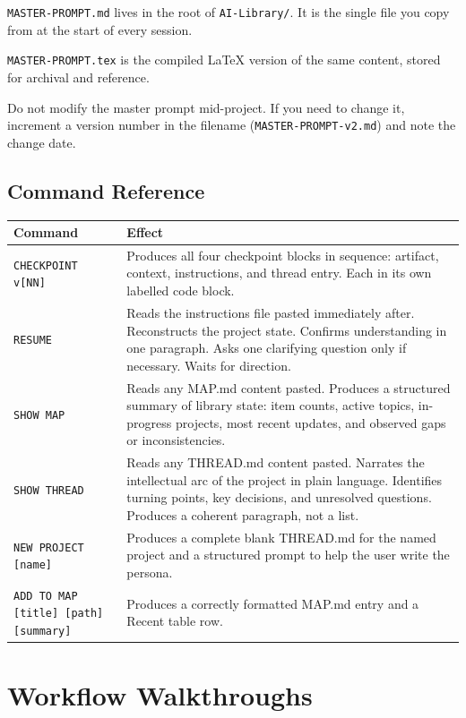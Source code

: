 \documentclass[12pt,letterpaper]{article}
\begin{document}
\texttt{MASTER-PROMPT.md} lives in the root of \texttt{AI-Library/}.
It is the single file you copy from at the start of every session.

\texttt{MASTER-PROMPT.tex} is the compiled LaTeX version of the same content,
stored for archival and reference.

Do not modify the master prompt mid-project. If you need to change it,
increment a version number in the filename
(\texttt{MASTER-PROMPT-v2.md}) and note the change date.

\subsection{Command Reference}

\begin{longtable}{@{}lp{9cm}@{}}
\toprule
\textbf{Command} & \textbf{Effect} \\
\midrule
\texttt{CHECKPOINT v[NN]} &
Produces all four checkpoint blocks in sequence: artifact, context,
instructions, and thread entry. Each in its own labelled code block. \\
\addlinespace
\texttt{RESUME} &
Reads the instructions file pasted immediately after.
Reconstructs the project state. Confirms understanding in one paragraph.
Asks one clarifying question only if necessary. Waits for direction. \\
\addlinespace
\texttt{SHOW MAP} &
Reads any MAP.md content pasted. Produces a structured summary of
library state: item counts, active topics, in-progress projects,
most recent updates, and observed gaps or inconsistencies. \\
\addlinespace
\texttt{SHOW THREAD} &
Reads any THREAD.md content pasted. Narrates the intellectual arc
of the project in plain language. Identifies turning points,
key decisions, and unresolved questions. Produces a coherent paragraph,
not a list. \\
\addlinespace
\texttt{NEW PROJECT [name]} &
Produces a complete blank THREAD.md for the named project and a
structured prompt to help the user write the persona. \\
\addlinespace
\texttt{ADD TO MAP [title] [path] [summary]} &
Produces a correctly formatted MAP.md entry and a Recent table row. \\
\bottomrule
\end{longtable}

\section{Workflow Walkthroughs}
\end{document}
